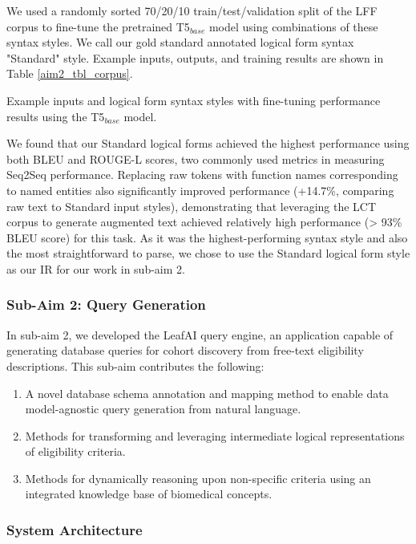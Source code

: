 \documentclass[../main.tex]{subfiles}
\begin{document}
We used a randomly sorted 70/20/10 train/test/validation split of the LFF corpus to fine-tune the pretrained T5$_{base}$ model using combinations of these syntax styles. We call our gold standard annotated logical form syntax "Standard" style. Example inputs, outputs, and training results are shown in Table \ref{aim2_tbl_corpus}. 

\begin{table}[h!]
    \footnotesize
    \centering
    
    \caption{Example inputs and logical form syntax styles with fine-tuning performance results using the T5$_{base}$ model.}
    \label{aim2_tbl_corpus}
\end{table} 

We found that our Standard logical forms achieved the highest performance using both BLEU \cite{lin2004rouge} and ROUGE-L \cite{ callison2006re} scores, two commonly used metrics in measuring Seq2Seq performance. Replacing raw tokens with function names corresponding to named entities also significantly improved performance (+14.7\%, comparing raw text to Standard input styles), demonstrating that leveraging the LCT corpus to generate augmented text achieved relatively high performance (> 93\% BLEU score) for this task. As it was the highest-performing syntax style and also the most straightforward to parse, we chose to use the Standard logical form style as our IR for our work in sub-aim 2.

\subsubsection{Sub-Aim 2: Query Generation}
In sub-aim 2, we developed the LeafAI query engine, an application capable of generating database queries for cohort discovery from free-text eligibility descriptions. This sub-aim contributes the following:

\begin{enumerate}
    \item{A novel database schema annotation and mapping method to enable data model-agnostic query generation from natural language.}
    \item{Methods for transforming and leveraging intermediate logical representations of eligibility criteria.}
    \item{Methods for dynamically reasoning upon non-specific criteria using an integrated knowledge base of biomedical concepts.}
\end{enumerate}

\subsubsection{System Architecture}
\end{document}
